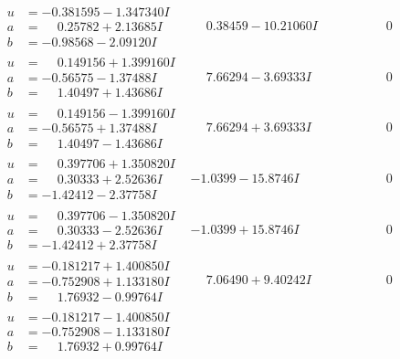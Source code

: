 \documentclass[1p]{elsarticle_modified}
\theoremstyle{definition}
\begin{document}
$$\begin{array}{c|c|c}
\begin{aligned}
u &= -0.381595 - 1.347340 I \\
a &= \phantom{-}0.25782 + 2.13685 I \\
b &= -0.98568 - 2.09120 I\end{aligned}
 & \phantom{-}0.38459 - 10.21060 I & \phantom{-0.000000 } 0 \\ \hline\begin{aligned}
u &= \phantom{-}0.149156 + 1.399160 I \\
a &= -0.56575 - 1.37488 I \\
b &= \phantom{-}1.40497 + 1.43686 I\end{aligned}
 & \phantom{-}7.66294 - 3.69333 I & \phantom{-0.000000 } 0 \\ \hline\begin{aligned}
u &= \phantom{-}0.149156 - 1.399160 I \\
a &= -0.56575 + 1.37488 I \\
b &= \phantom{-}1.40497 - 1.43686 I\end{aligned}
 & \phantom{-}7.66294 + 3.69333 I & \phantom{-0.000000 } 0 \\ \hline\begin{aligned}
u &= \phantom{-}0.397706 + 1.350820 I \\
a &= \phantom{-}0.30333 + 2.52636 I \\
b &= -1.42412 - 2.37758 I\end{aligned}
 & -1.0399 - 15.8746 I & \phantom{-0.000000 } 0 \\ \hline\begin{aligned}
u &= \phantom{-}0.397706 - 1.350820 I \\
a &= \phantom{-}0.30333 - 2.52636 I \\
b &= -1.42412 + 2.37758 I\end{aligned}
 & -1.0399 + 15.8746 I & \phantom{-0.000000 } 0 \\ \hline\begin{aligned}
u &= -0.181217 + 1.400850 I \\
a &= -0.752908 + 1.133180 I \\
b &= \phantom{-}1.76932 - 0.99764 I\end{aligned}
 & \phantom{-}7.06490 + 9.40242 I & \phantom{-0.000000 } 0 \\ \hline\begin{aligned}
u &= -0.181217 - 1.400850 I \\
a &= -0.752908 - 1.133180 I \\
b &= \phantom{-}1.76932 + 0.99764 I\end{aligned}

\end{array}$$
\end{document}
